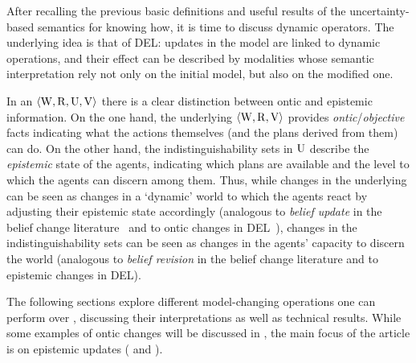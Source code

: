 \medskip

After recalling the previous basic definitions and useful results of the uncertainty-based semantics for knowing how, it is time to discuss dynamic operators. The underlying idea is that of DEL: updates in the model are linked to dynamic operations, and their effect can be described by modalities whose semantic interpretation rely not only on the initial model, but also on the modified one. 

In an \ults $\langle \operatorname{W},\operatorname{R},\operatorname{U},\operatorname{V} \rangle$ there is a clear distinction between ontic and epistemic information. On the one hand, the underlying \lts $\langle \operatorname{W},\operatorname{R},\operatorname{V} \rangle$ provides \emph{ontic}/\emph{objective} facts indicating what the actions themselves (and the plans derived from them) can do. On the other hand, the indistinguishability sets in $\operatorname{U}$ describe the \emph{epistemic} state of the agents, indicating which plans are available and the level to which the agents can discern among them. Thus, while changes in the underlying \lts can be seen as changes in a `dynamic' world to which the agents react by adjusting their epistemic state accordingly (analogous to  \emph{belief update} in the belief change literature~\cite{sep-logic-belief-revision} and to ontic changes in DEL~\cite{vanDitmarschKooi2008}), changes in the indistinguishability sets can be seen as changes in the agents' capacity to discern the world (analogous to \emph{belief revision} in the belief change literature and to epistemic changes in DEL).

The following sections explore different model-changing operations one can perform over \ultss, discussing their interpretations as well as technical results. While some examples of ontic changes will be discussed in , the main focus of the article is on epistemic updates ( and ).





